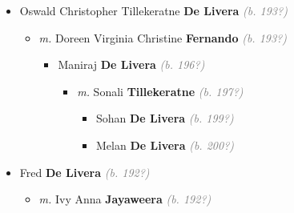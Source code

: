 \documentclass[10pt, openany]{book}
\begin{document}
\begin{itemize}
{\begin{itemize}
{\begin{itemize}
{\begin{itemize}
{\begin{itemize}
\item{\textit{m.} Maxwell \textbf{Fernando} \textcolor{gray}{\textit{(b. 197?)}}   \label{couple:00002353:00002362} \begin{itemize}
\item{Stephani \textbf{Fernando} \textcolor{gray}{\textit{(b. 200?)}}
 }
\item{Shehan \textbf{Fernando} \textcolor{gray}{\textit{(b. 200?)}}
 }
\end{itemize}}
\end{itemize}
  }
\end{itemize}}
\end{itemize}
    }
\item{Oswald Christopher Tillekeratne \textbf{De Livera} \textcolor{gray}{\textit{(b. 193?)}}
\begin{itemize}
\item{\textit{m.} Doreen Virginia Christine \textbf{Fernando} \textcolor{gray}{\textit{(b. 193?)}}   \label{couple:00002366:00002367} \begin{itemize}
\item{Maniraj \textbf{De Livera} \textcolor{gray}{\textit{(b. 196?)}}
\begin{itemize}
\item{\textit{m.} Sonali \textbf{Tillekeratne} \textcolor{gray}{\textit{(b. 197?)}}   \label{couple:00002368:00002369} \begin{itemize}
\item{Sohan \textbf{De Livera} \textcolor{gray}{\textit{(b. 199?)}}
  }
\item{Melan \textbf{De Livera} \textcolor{gray}{\textit{(b. 200?)}}
  }
\end{itemize}}
\end{itemize}
  }
\end{itemize}}
\end{itemize}
    }
\item{Fred \textbf{De Livera} \textcolor{gray}{\textit{(b. 192?)}}
\begin{itemize}
\item{\textit{m.} Ivy Anna \textbf{Jayaweera} \textcolor{gray}{\textit{(b. 192?)}}   \label{couple:00001226:00002301} \begin{itemize}

\end{itemize}}
\end{itemize}}
\end{itemize}}
\end{itemize}
\end{document}
